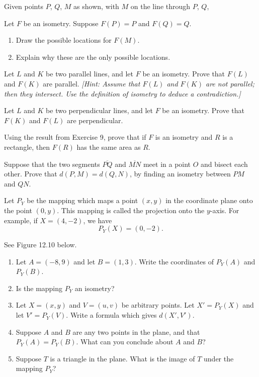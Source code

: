 \documentclass[12pt]{book} %
\begin{document}
\begin{ExerciseList}
\begin{ExerciseList}
\Exercise Given points $P$, $Q$, $M$ as shown, with $M$ on the line through $P$, $Q$,


Let $F$ be an isometry. Suppose $F(P)=P$ and $F(Q)=Q$.
\begin{enumerate}
\item[(a)] Draw the possible locations for $F(M)$.
\item[(b)] Explain why these are the only possible locations.
\end{enumerate}

\Exercise Let $L$ and $K$ be two parallel lines, and let $F$ be an isometry. Prove that $F(L)$ and $F(K)$ are parallel. \textit{[Hint: Assume that $F(L)$ and $F(K)$ are not parallel; then they intersect. Use the definition of isometry to deduce a contradiction.]}

\Exercise Let $L$ and $K$ be two perpendicular lines, and let $F$ be an isometry. Prove that $F(K)$ and $F(L)$ are perpendicular.

\Exercise Using the result from Exercise 9, prove that if $F$ is an isometry and $R$ is a rectangle, then $F(R)$ has the same area as $R$.

\Exercise Suppose that the two segments $\overline{PQ}$ and $\overline{MN}$ meet in a point $O$ and bisect each other. Prove that $d(P,M)=d(Q,N)$, by finding an isometry between $PM$ and $QN$.

\end{ExerciseList}

\setcounter{Exercise}{13}
\begin{ExerciseList}
\Exercise Let $P_Y$ be the mapping which maps a point $(x,y)$ in the coordinate plane onto the point $(0,y)$. This mapping is called the projection onto the $y$-axis. For example, if $X=(4,-2)$, we have
\[
P_Y(X)=(0,-2).
\]

See Figure 12.10 below.


\begin{enumerate}
\item[(a)] Let $A=(-8,9)$ and let $B=(1,3)$. Write the coordinates of $P_Y(A)$ and $P_Y(B)$.
\item[(b)] Is the mapping $P_Y$ an isometry?
\item[(c)] Let $X=(x,y)$ and $V=(u,v)$ be arbitrary points. Let $X'=P_Y(X)$ and let $V'=P_Y(V)$. Write a formula which gives $d(X',V')$.
\item[(d)] Suppose $A$ and $B$ are any two points in the plane, and that $P_Y(A)=P_Y(B)$. What can you conclude about $A$ and $B$?
\item[(e)] Suppose $T$ is a triangle in the plane. What is the image of $T$ under the mapping $P_Y$?
\end{enumerate}
\end{ExerciseList}


\end{ExerciseList}
\end{document}
